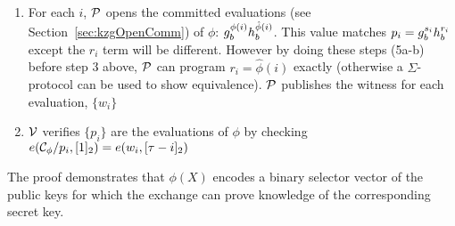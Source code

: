 \begin{Protocol*}[t!]
\begin{framed}
\begin{enumerate}
\begin{enumerate}
		\item For each $i$, $\mathcal{P}$ opens the committed evaluations (see Section~\ref{sec:kzgOpenComm}) of $\phi$: $g_b^{\phi(i)}h_b^{\hat\phi(i)}$. This value matches $p_i=g_b^{s_i}h_b^{r_i}$ except the $r_i$ term will be different. However by doing these steps (5a-b) before step 3 above, $\mathcal{P}$ can program $r_i=\hat\phi(i)$ exactly (otherwise a $\Sigma$-protocol can be used to show equivalence).  $\mathcal{P}$ publishes the witness for each evaluation, $\{w_i\}$
		
		\item $\mathcal{V}$ verifies $\{p_i\}$ are the evaluations of $\phi$ by checking $e(\mathcal{C}_\phi/p_i, [1]_2)=e(w_i, [\tau-i]_2)$
   
\end{enumerate}
\end{enumerate}
\normalsize	
\end{framed}
\caption{The \bootstrap proof demonstrates that $\phi(X)$ encodes a binary selector vector of the public keys for which the exchange can prove knowledge of the corresponding secret key. \label{alg:boot}}
\end{Protocol*}
